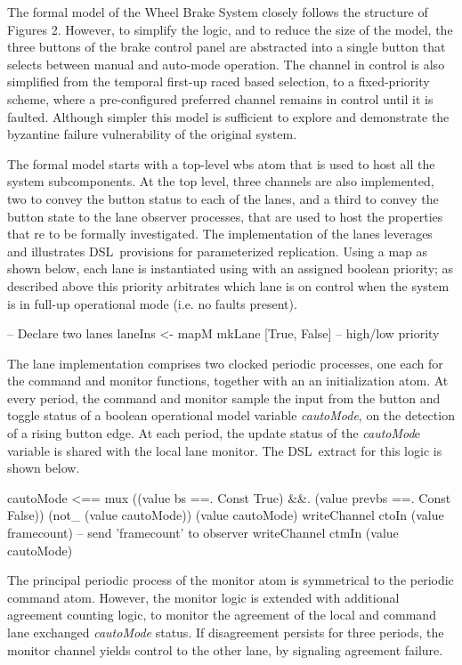 

The formal model  of the  Wheel Brake System closely follows the structure  of  Figures 2.
However, to simplify the logic, and to reduce the size of the model, the
three buttons of the brake control panel are abstracted into a single button
that selects between manual and auto-mode operation.  The channel in control
is also simplified from the temporal first-up raced based selection, to a  fixed-priority scheme, where a pre-configured preferred channel remains in control
until it is faulted. Although simpler this model is sufficient to explore and demonstrate the byzantine failure vulnerability of the original system. 

The formal model starts with a top-level wbs atom that is used
to host all the system subcomponents. At the top level, three channels
are also implemented, two to convey the button status to each of the lanes,
and a third to convey the button state to the lane observer processes, that are used to host the properties that re to be formally investigated.
The   implementation of the lanes leverages and illustrates DSL\ provisions for parameterized replication.
 Using a map as shown below,  each lane is instantiated using with an assigned boolean  priority;  as described above   this priority arbitrates which lane is on control when the system is in full-up operational mode (i.e. no faults present).

\begin{lima}
 -- Declare two lanes
  laneIns <- mapM mkLane [True, False]  -- high/low priority
\end{lima}

 The lane implementation comprises two clocked periodic processes, one each for the  command and monitor  functions, together with an  an initialization  atom. At every period, the command and monitor sample the input from the button and toggle status of a boolean  operational model variable \textit{cautoMode},  on the detection of a rising button edge.  At each period, the update status of the \textit{cautoMod}e variable is shared with the local lane monitor.
 The DSL\ extract for this logic is shown below.



\begin{lima}

   cautoMode <== mux ((value bs ==. Const True) &&.
                       (value prevbs ==. Const False))
                      (not_ (value cautoMode))
                      (value cautoMode)
    writeChannel ctoIn (value framecount)  -- send 'framecount' to observer
    writeChannel ctmIn (value cautoMode)
      
\end{lima}
  The principal periodic process of the monitor atom is symmetrical to the periodic command atom. However, the monitor logic is extended with additional agreement counting logic, to monitor the agreement of the local and  command lane exchanged   \emph{cautoMode}  status. If disagreement persists   for three periods, the  monitor channel yields control to the other lane, by signaling  agreement failure.  

